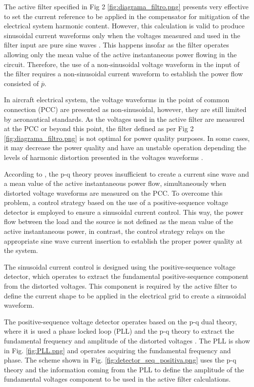 The active filter specified in Fig 2 \ref{fig:diagrama_filtro.png} presents very effective to set the current reference to be applied in the compensator for mitigation of the electrical system harmonic content. However, this calculation is valid to produce sinusoidal current waveforms only when the voltages measured and used in the filter input are pure sine waves \cite{Akagi2007}. This happens insofar as the filter operates allowing only the mean value of the active instantaneous power flowing in the circuit. Therefore, the use of a non-sinusoidal voltage waveform in the input of the filter requires a non-sinusoidal current waveform to establish the power flow consisted of $\overline{p}$.

In aircraft electrical system, the voltage waveforms in the point of common connection (PCC) are presented as non-sinusoidal, however, they are still limited by aeronautical standards. As the voltages used in the active filter are measured at the PCC or beyond this point, the filter defined as per Fig 2 \ref{fig:diagrama_filtro.png} is not optimal for power quality purposes. In some cases, it may decrease the power quality and have an unstable operation depending the levels of harmonic distortion presented in the voltages waveforms \cite{Akagi2007}.

According to \cite{Akagi2007}, the p-q theory proves insufficient to create a current sine wave and a mean value of the active instantaneous power flow, simultaneously when distorted voltage waveforms are measured on the PCC. To overcome this problem, a control strategy based on the use of a positive-sequence voltage detector is employed to ensure a sinusoidal current control. This way, the power flow between the load and the source is not defined as the mean value of the active instantaneous power, in contrast, the control strategy relays on the appropriate sine wave current insertion to establish the proper power quality at the system.

The sinusoidal current control is designed using the positive-sequence voltage detector, which operates to extract the fundamental positive-sequence component from the distorted voltages. This component is required by the active filter to define the current shape to be applied in the electrical grid to create a sinusoidal waveform. 

The positive-sequence voltage detector operates based on the p-q dual theory, where it is used a phase locked loop (PLL) and the p-q theory to extract the fundamental frequency and amplitude of the distorted voltages \cite{Akagi2007}. The PLL is show in Fig. \ref{fig:PLL.png} and operates acquiring the fundamental frequency and phase. The scheme shown in Fig. \ref{fig:detector_seq_positiva.png} uses the p-q theory and the information coming from the PLL to define the amplitude of the fundamental voltages component to be used in the active filter calculations.


